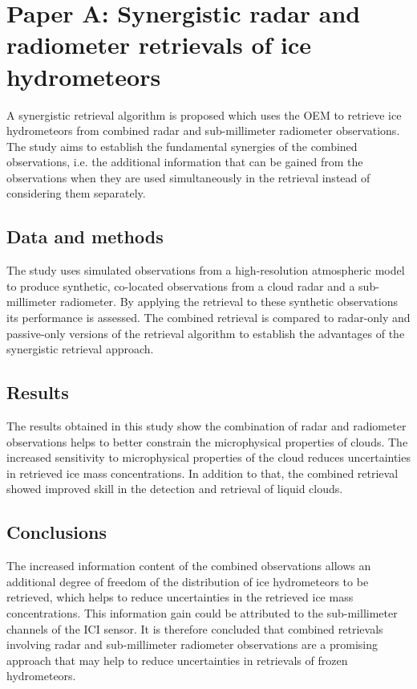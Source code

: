 \section{Paper A: Synergistic radar and radiometer retrievals of ice hydrometeors}

A synergistic retrieval algorithm is proposed which uses the OEM to retrieve ice
hydrometeors from combined radar and sub-millimeter radiometer observations. The
study aims to establish the fundamental synergies of the combined observations,
i.e. the additional information that can be gained from the observations when
they are used simultaneously in the retrieval instead of considering them
separately.

\subsection{Data and methods}

The study uses simulated observations from a high-resolution atmospheric model
to produce synthetic, co-located observations from a cloud radar and a
sub-millimeter radiometer. By applying the retrieval to these synthetic
observations its performance is  assessed. The combined retrieval is compared
to radar-only and passive-only versions of the retrieval algorithm to establish
the advantages of the synergistic retrieval approach.

\subsection{Results}

The results obtained in this study show the combination of radar and radiometer
observations helps to better constrain the microphysical properties of clouds.
The increased sensitivity to microphysical properties of the cloud reduces
uncertainties in retrieved ice mass concentrations. In addition to that, the
combined retrieval showed improved skill in the detection and retrieval of
liquid clouds.

\subsection{Conclusions}

The increased information content of the combined observations allows an
additional degree of freedom of the distribution of ice hydrometeors to be
retrieved, which helps to reduce uncertainties in the retrieved ice mass
concentrations. This information gain could be attributed to the sub-millimeter
channels of the ICI sensor. It is therefore concluded that combined retrievals
involving radar and sub-millimeter radiometer observations are a promising
approach that may help to reduce uncertainties in retrievals of frozen
hydrometeors.

